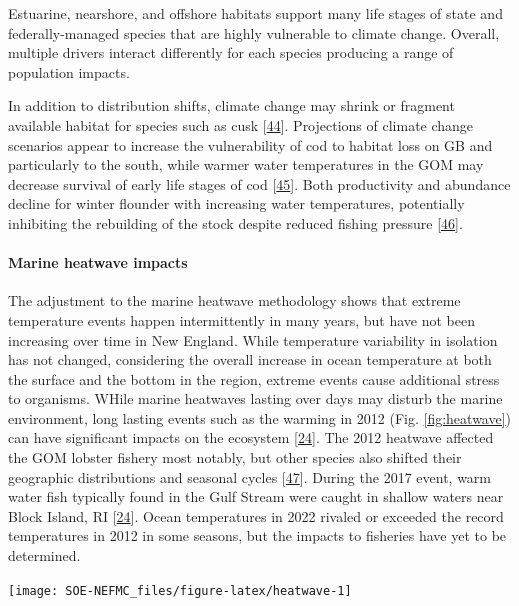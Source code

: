 \documentclass[
  10pt,
]{article}
\let\origfigure\figure
\let\endorigfigure\endfigure
\renewenvironment{figure}[1][2] {
    \expandafter\origfigure\expandafter[H]
} {
    \endorigfigure
}
\begin{document}
Estuarine, nearshore, and offshore habitats support many life stages of state and federally-managed species that are highly vulnerable to climate change. Overall, multiple drivers interact differently for each species producing a range of population impacts.

In addition to distribution shifts, climate change may shrink or fragment available habitat for species such as cusk {[}\protect\hyperlink{ref-hare_cusk_2012}{44}{]}. Projections of climate change scenarios appear to increase the vulnerability of cod to habitat loss on GB and particularly to the south, while warmer water temperatures in the GOM may decrease survival of early life stages of cod {[}\protect\hyperlink{ref-fogarty_cod_2007}{45}{]}. Both productivity and abundance decline for winter flounder with increasing water temperatures, potentially inhibiting the rebuilding of the stock despite reduced fishing pressure {[}\protect\hyperlink{ref-bell_rebuilding_2014}{46}{]}.

\hypertarget{marine-heatwave-impacts}{%
\paragraph{Marine heatwave impacts}\label{marine-heatwave-impacts}}

The adjustment to the marine heatwave methodology shows that extreme temperature events happen intermittently in many years, but have not been increasing over time in New England. While temperature variability in isolation has not changed, considering the overall increase in ocean temperature at both the surface and the bottom in the region, extreme events cause additional stress to organisms. WHile marine heatwaves lasting over days may disturb the marine environment, long lasting events such as the warming in 2012 (Fig. \ref{fig:heatwave}) can have significant impacts on the ecosystem {[}\protect\hyperlink{ref-gawarkiewicz_characteristics_2019}{24}{]}. The 2012 heatwave affected the GOM lobster fishery most notably, but other species also shifted their geographic distributions and seasonal cycles {[}\protect\hyperlink{ref-mills_fisheries_2013}{47}{]}. During the 2017 event, warm water fish typically found in the Gulf Stream were caught in shallow waters near Block Island, RI {[}\protect\hyperlink{ref-gawarkiewicz_characteristics_2019}{24}{]}. Ocean temperatures in 2022 rivaled or exceeded the record temperatures in 2012 in some seasons, but the impacts to fisheries have yet to be determined.

\begin{figure}

{\centering \texttt{[image: SOE-NEFMC\_files/figure-latex/heatwave-1]} 

}

\caption{Marine heatwave maximum intesity (left) and total days each year (right) in the Gulf of Maine.}\label{fig:heatwave}
\end{figure}
\end{document}
